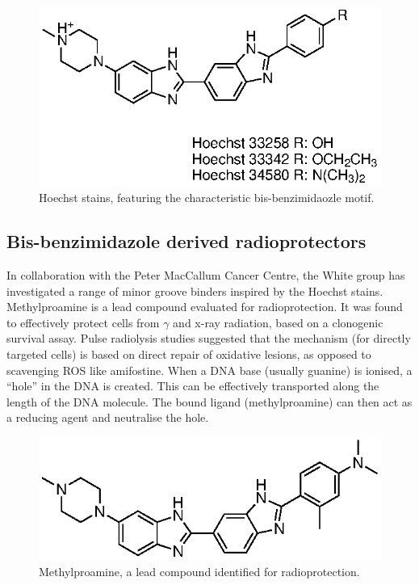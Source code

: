 \begin{refsection}
\begin{figure}
\centering
\includegraphics[scale=0.74]{Figures/hoechst.eps}
\caption{Hoechst stains, featuring the characteristic bis-benzimidaozle motif.}
\label{fig:hoechst}
\end{figure}

\subsection{Bis-benzimidazole derived radioprotectors}

In collaboration with the Peter MacCallum Cancer Centre, the White group has investigated a range of minor groove binders inspired by the Hoechst stains.
Methylproamine is a lead compound evaluated for radioprotection.
It was found to effectively protect cells from $\gamma$ and x-ray radiation, based on a clonogenic survival assay.
Pulse radiolysis studies suggested that the mechanism (for directly targeted cells) is based on direct repair of oxidative lesions, as opposed to scavenging ROS like amifostine.
When a DNA base (usually guanine) is ionised, a ``hole'' in the DNA is created.
This can be effectively transported along the length of the DNA molecule\autocite{Giese2002}.
The bound ligand (methylproamine) can then act as a reducing agent and neutralise the hole.

\begin{figure}
\includegraphics[scale=0.74]{Figures/methylproamine.eps}
\caption{Methylproamine, a lead compound identified for radioprotection.}
\label{fig:methylproamine}
\end{figure}


\end{refsection}
